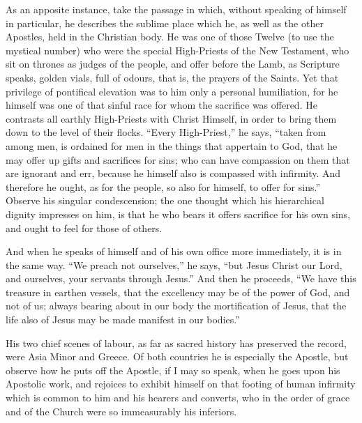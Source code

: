 As an apposite instance, take the passage in which,
without speaking of himself in particular, he describes
the sublime place which he, as well as the other
Apostles, held in the Christian body. He was one of those
Twelve (to use the mystical number) who were the special
High-Priests of the New Testament, who sit on thrones as
judges of the people, and offer before the Lamb, as
Scripture speaks, golden vials, full of odours, that is,
the prayers of the Saints. Yet that privilege of
pontifical elevation was to him only a personal
humiliation, for he himself was one of that sinful race
for whom the sacrifice was offered. He contrasts all
earthly High-Priests with Christ Himself, in order to
bring them down to the level of their flocks. ``Every
High-Priest,'' he says, ``taken from among men,
is ordained for men in the things that appertain to God,
that he may offer up gifts and sacrifices for sins; who
can have compassion on them that are ignorant and err,
because he himself also is compassed with infirmity. And
therefore he ought, as for the people, so also for
himself, to offer for sins.'' Observe his singular
condescension; the one thought which his hierarchical
dignity impresses on him, is that he who bears it offers
sacrifice for his own sins, and ought to feel for those
of others.

And when he speaks of himself and of his own office
more immediately, it is in the same way. ``We preach
not ourselves,'' he says, ``but Jesus Christ our
Lord, and ourselves, your servants through Jesus.''
And then he proceeds, ``We have this treasure in
earthen vessels, that the excellency may be of the power
of God, and not of us; always bearing about in our body
the mortification of Jesus, that the life also of Jesus
may be made manifest in our bodies.''

His two chief scenes of labour, as far as sacred
history has preserved the record, were Asia Minor and
Greece. Of both countries he is especially the Apostle,
but observe how he puts off the Apostle, if I may so
speak, when he goes upon his Apostolic work, and rejoices
to exhibit himself on that footing of human infirmity
which is common to him and his hearers and converts, who
in the order of grace and of the Church were so
immeasurably his inferiors.

